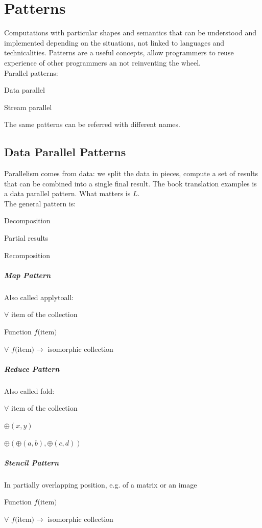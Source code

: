 \documentclass[10pt]{report}
\begin{document}
\section{Patterns}
Computations with particular shapes and semantics that can be understood and implemented depending on the situations, not linked to languages and technicalities. Patterns are a useful concepts, allow programmers to reuse experience of other programmers an not reinventing the wheel.\\
Parallel patterns:
\begin{list}{}{}
	\item Data parallel
	\item Stream parallel
\end{list}
The same patterns can be referred with different names.
\subsection{Data Parallel Patterns}
Parallelism comes from data: we split the data in pieces, compute a set of results that can be combined into a single final result. The book translation examples is a data parallel pattern. What matters is $L$.\\
The general pattern is:
\begin{list}{}{}
	\item Decomposition
	\item Partial results
	\item Recomposition
\end{list}\begin{multicols}{2}
\subparagraph{Map Pattern} Also called applytoall:\begin{list}{}{}
	\item $\forall$ item of the collection
	\item Function $f($item$)$
	\item $\forall$ $f($item$) \rightarrow$ isomorphic collection
\end{list}
\subparagraph{Reduce Pattern} Also called fold:\begin{list}{}{}
	\item $\forall$ item of the collection
	\item $\oplus(x,y)$
	\item $\oplus(\oplus(a,b),\oplus(c,d))$
\end{list}
\end{multicols}
\subparagraph{Stencil Pattern} \begin{list}{}{}
	\item In partially overlapping position, e.g. of a matrix or an image
	\item Function $f($item$)$
	\item $\forall$ $f($item$) \rightarrow$ isomorphic collection
\end{list}
\end{document}
